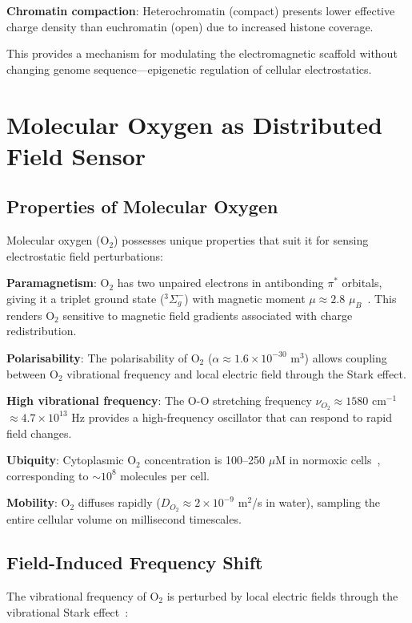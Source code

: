 \documentclass[twocolumn,10pt,aps,prd,superscriptaddress,floatfix,nofootinbib]{revtex4-2}
\theoremstyle{remark}
\begin{document}
\textbf{Chromatin compaction}: Heterochromatin (compact) presents lower effective charge density than euchromatin (open) due to increased histone coverage.

This provides a mechanism for modulating the electromagnetic scaffold without changing genome sequence---epigenetic regulation of cellular electrostatics.

\section{Molecular Oxygen as Distributed Field Sensor}
\label{sec:oxygen}

\subsection{Properties of Molecular Oxygen}

Molecular oxygen (O$_2$) possesses unique properties that suit it for sensing electrostatic field perturbations:

\textbf{Paramagnetism}: O$_2$ has two unpaired electrons in antibonding $\pi^*$ orbitals, giving it a triplet ground state ($^3\Sigma_g^-$) with magnetic moment $\mu \approx 2.8$ $\mu_B$~\cite{Herzberg1950}. This renders O$_2$ sensitive to magnetic field gradients associated with charge redistribution.

\textbf{Polarisability}: The polarisability of O$_2$ ($\alpha \approx 1.6 \times 10^{-30}$ m$^3$) allows coupling between O$_2$ vibrational frequency and local electric field through the Stark effect.

\textbf{High vibrational frequency}: The O-O stretching frequency $\nu_{O_2} \approx 1580$ cm$^{-1}$ $\approx 4.7 \times 10^{13}$ Hz provides a high-frequency oscillator that can respond to rapid field changes.

\textbf{Ubiquity}: Cytoplasmic O$_2$ concentration is 100--250 $\mu$M in normoxic cells~\cite{Wenger2015}, corresponding to $\sim 10^8$ molecules per cell.

\textbf{Mobility}: O$_2$ diffuses rapidly ($D_{O_2} \approx 2 \times 10^{-9}$ m$^2$/s in water), sampling the entire cellular volume on millisecond timescales.

\subsection{Field-Induced Frequency Shift}

The vibrational frequency of O$_2$ is perturbed by local electric fields through the vibrational Stark effect~\cite{Boxer2009}:
\end{document}
